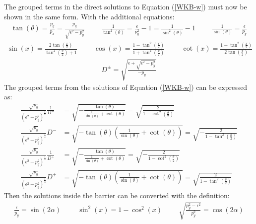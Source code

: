 		The grouped terms in the direct solutions to Equation (\ref{WKB-w}) must now be shown in the same form. With the additional equations:
		\begin{align}
			\tan(\theta)=\frac{p_{y}}{p_{x}}=\frac{p_{y}}{\sqrt{\epsilon^{2}-p_{y}^{2}}}
			\hspace{1cm}
			\frac{1}{\tan^{2}(\theta)}=\frac{\epsilon}{p_{y}^{2}}-1=\frac{1}{\sin^{2}(\theta)}-1
			\hspace{1cm}
			\frac{1}{\sin(\theta)}=\frac{\epsilon}{p_{y}}
		\end{align}		
		\begin{align}
			\sin(x)=\frac{2\tan\left(\frac{x}{2}\right)}{\tan^{2}\left(\frac{x}{2}\right)+1}
			\hspace{1cm}
			\cos(x)=\frac{1-\tan^{2}\left(\frac{x}{2}\right)}{1+\tan^{2}\left(\frac{x}{2}\right)}
			\hspace{1cm}
			\cot(x)=\frac{1-\tan^{2}\left(\frac{x}{2}\right)}{2\tan\left(\frac{x}{2}\right)}
		\end{align}
		\begin{align}
			D^{\pm}=\sqrt{\frac{\epsilon+\sqrt{\epsilon^{2}-p_{y}^{2}}}{-p_{y}}}
		\end{align}
		The grouped terms from the solutions of Equation (\ref{WKB-w}) can be expressed as:
		\begin{align}
			\frac{\sqrt{p_{y}}}{\left(\epsilon^{2}-p_{y}^{2}\right)^{\frac{1}{4}}}\frac{1}{D^{-}}&=\sqrt{-\frac{\tan(\theta)}{\frac{1}{\sin(\theta)}+\cot(\theta)}}=\sqrt{\frac{2}{1-\cot^{2}\left(\frac{\theta}{2}\right)}}
			\\
			\frac{\sqrt{p_{y}}}{\left(\epsilon^{2}-p_{y}^{2}\right)^{\frac{1}{4}}}D^{-}&=\sqrt{-\tan(\theta)\left(\frac{1}{\sin(\theta)}+\cot(\theta)\right)}=\sqrt{-\frac{2}{1-\tan^{2}\left(\frac{\theta}{2}\right)}}
			\\
			\frac{\sqrt{p_{y}}}{\left(\epsilon^{2}-p_{y}^{2}\right)^{\frac{1}{4}}}\frac{1}{D^{+}}&=\sqrt{-\frac{\tan(\theta)}{\frac{1}{\sin(\theta)}+\cot(\theta)}}=\sqrt{-\frac{2}{1-\cot^{2}\left(\frac{\theta}{2}\right)}}
			\\
			\frac{\sqrt{p_{y}}}{\left(\epsilon^{2}-p_{y}^{2}\right)^{\frac{1}{4}}}D^{+}&=\sqrt{-\tan(\theta)\left(\frac{1}{\sin(\theta)}+\cot(\theta)\right)}=\sqrt{\frac{2}{1-\tan^{2}\left(\frac{\theta}{2}\right)}}
		\end{align}
		Then the solutions inside the barrier can be converted with the definition:
		\begin{align}
			\frac{\epsilon}{p_{y}}=\sin(2\alpha)
			\hspace{1cm}
			\sin^{2}(x)=1-\cos^{2}(x)
			\hspace{1cm}\sqrt{\frac{p_{y}^{2}-\epsilon^{2}}{p_{y}^{2}}}=\cos(2\alpha)
		\end{align}
